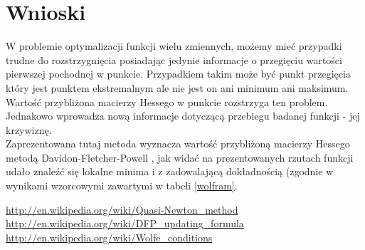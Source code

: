 \documentclass{classrep}
\begin{document}
\section{Wnioski}
W problemie optymalizacji funkcji wielu zmiennych, możemy mieć przypadki trudne do rozstrzygnięcia posiadając jedynie informacje o przegięciu wartości pierwszej pochodnej w punkcie. Przypadkiem takim może być punkt przegięcia który jest punktem ekstremalnym ale nie jest on ani minimum ani maksimum. Wartość przybliżona macierzy Hessego w punkcie rozstrzyga ten problem. Jednakowo wprowadza nową informacje dotyczącą przebiegu badanej funkcji - jej krzywiznę.\\
Zaprezentowana tutaj metoda wyznacza wartość przybliżoną macierzy Hessego metodą Davidon-Fletcher-Powell \cite{2}, jak widać na prezentowanych rzutach funkcji udało znaleźć się lokalne minima i z zadowalającą dokładnością (zgodnie w wynikami wzorcowymi zawartymi w tabeli \ref{wolfram}.

\begin{thebibliography}{9}
 \url{http://en.wikipedia.org/wiki/Quasi-Newton_method}
 \url{http://en.wikipedia.org/wiki/DFP_updating_formula}
 \url{http://en.wikipedia.org/wiki/Wolfe_conditions}
\end{thebibliography}
\end{document}
